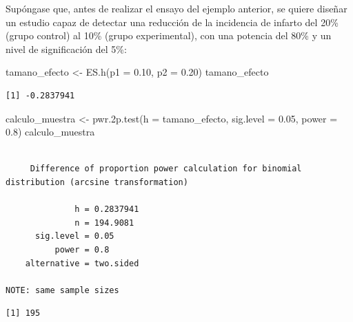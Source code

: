 \documentclass[
  spanish,
  a4paper,
]{scrreport}
\newenvironment{Shaded}{\begin{snugshade}}{\end{snugshade}}
\newcommand{\AttributeTok}[1]{\textcolor[rgb]{0.40,0.45,0.13}{#1}}
\newcommand{\FloatTok}[1]{\textcolor[rgb]{0.68,0.00,0.00}{#1}}
\newcommand{\FunctionTok}[1]{\textcolor[rgb]{0.28,0.35,0.67}{#1}}
\newcommand{\NormalTok}[1]{\textcolor[rgb]{0.00,0.23,0.31}{#1}}
\newcommand{\OtherTok}[1]{\textcolor[rgb]{0.00,0.23,0.31}{#1}}
\newcommand{\SpecialCharTok}[1]{\textcolor[rgb]{0.37,0.37,0.37}{#1}}
\theoremstyle{definition}
\theoremstyle{definition}
\theoremstyle{remark}
\begin{document}
Supóngase que, antes de realizar el ensayo del ejemplo anterior, se
quiere diseñar un estudio capaz de detectar una reducción de la
incidencia de infarto del 20\% (grupo control) al 10\% (grupo
experimental), con una potencia del 80\% y un nivel de significación del
5\%:

\begin{Shaded}
\begin{Highlighting}[]
\NormalTok{tamano\_efecto }\OtherTok{\textless{}{-}} \FunctionTok{ES.h}\NormalTok{(}\AttributeTok{p1 =} \FloatTok{0.10}\NormalTok{, }\AttributeTok{p2 =} \FloatTok{0.20}\NormalTok{)}
\NormalTok{tamano\_efecto}
\end{Highlighting}
\end{Shaded}

\begin{verbatim}
[1] -0.2837941
\end{verbatim}

\begin{Shaded}
\begin{Highlighting}[]
\NormalTok{calculo\_muestra }\OtherTok{\textless{}{-}} \FunctionTok{pwr.2p.test}\NormalTok{(}\AttributeTok{h =}\NormalTok{ tamano\_efecto, }\AttributeTok{sig.level =} \FloatTok{0.05}\NormalTok{, }\AttributeTok{power =} \FloatTok{0.8}\NormalTok{)}
\NormalTok{calculo\_muestra}
\end{Highlighting}
\end{Shaded}

\begin{verbatim}

     Difference of proportion power calculation for binomial distribution (arcsine transformation) 

              h = 0.2837941
              n = 194.9081
      sig.level = 0.05
          power = 0.8
    alternative = two.sided

NOTE: same sample sizes
\end{verbatim}

\begin{Shaded}
\end{Shaded}

\begin{verbatim}
[1] 195
\end{verbatim}
\end{document}
